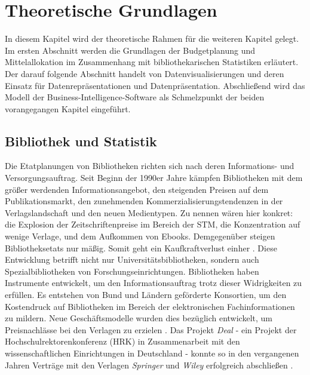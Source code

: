 \chapter{Theoretische Grundlagen}
\label{chap:two}
In diesem Kapitel wird der theoretische Rahmen für die weiteren Kapitel gelegt. Im
ersten Abschnitt werden die Grundlagen der Budgetplanung und Mittelallokation im Zusammenhang mit bibliothekarischen Statistiken erläutert. 
Der darauf folgende Abschnitt handelt von Datenvisualisierungen und deren Einsatz
für Datenrepräsentationen und Datenpräsentation. Abschließend wird das Modell der Business-Intelligence-Software als Schmelzpunkt der 
beiden vorangegangen Kapitel eingeführt.

\section{Bibliothek und Statistik}
\label{chap:two_one}
Die Etatplanungen von Bibliotheken richten sich nach deren Informations- und Versorgungsauftrag. 
Seit Beginn der 1990er Jahre kämpfen Bibliotheken mit dem größer werdenden Informationsangebot, den steigenden Preisen auf dem Publikationsmarkt, 
den zunehmenden Kommerzialisierungstendenzen in der Verlagslandschaft und den neuen Medientypen. 
Zu nennen wären hier konkret: die Explosion der Zeitschriftenpreise im Bereich der \acrfull{STM}, die Konzentration auf wenige Verlage, 
und dem Aufkommen von Ebooks. Demgegenüber steigen Bibliotheksetats nur mäßig. 
Somit geht ein Kaufkraftverlust einher \cite[Vgl.][164 ff.]{moravetz-kuhlmann_monika_erwerbungspolitik_2015}.
Diese Entwicklung betrifft nicht nur Universitätsbibliotheken, sondern auch Spezialbibliotheken von Forschungseinrichtungen.
Bibliotheken haben Instrumente entwickelt, um den Informationsauftrag trotz dieser Widrigkeiten zu erfüllen.
Es entstehen von Bund und Ländern geförderte Konsortien, um den Kostendruck auf Bibliotheken im Bereich der elektronischen
Fachinformationen zu mildern. Neue Geschäftsmodelle wurden dies bezüglich entwickelt, um Preisnachlässe bei den Verlagen zu erzielen
\cite[Vgl.][169 ff.]{moravetz-kuhlmann_monika_erwerbungspolitik_2015}. Das Projekt \textit{Deal} - ein Projekt der Hochschulrektorenkonferenz (HRK) in Zusammenarbeit mit den
wissenschaftlichen Einrichtungen in Deutschland - konnte so in den vergangenen Jahren Verträge mit den Verlagen \textit{Springer} und \textit{Wiley} erfolgreich abschließen \cite[Vgl.][]{projekt_deal_projekt_2020}.

